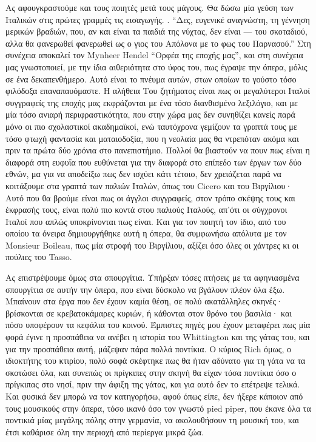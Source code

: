 Ας αφουγκραστούμε και τους ποιητές μετά τους μάγους. Θα δώσω μία γεύση των Ιταλικών στις πρώτες γραμμές τις εισαγωγής. . \enquote{Δες, ευγενικέ αναγνώστη, τη γέννηση μερικών βραδιών, που, αν και είναι τα παιδιά της νύχτας, δεν είναι --- του σκοταδιού, αλλα θα φανερωθεί φανερωθεί ως ο γιος του Απόλονα με το φως του Παρνασού.} Στη συνέχεια αποκαλεί τον Mynheer Hendel \enquote{Ορφέα της εποχής μας}, και στη συνέχεια μας γνωστοποιεί, με την ίδια αιθεριότητα στο ύφος του, πως έγραψε την όπερα, μόλις σε ένα δεκαπενθήμερο. Αυτό είναι το πνέυμα αυτών, στων οποίων το γούστο τόσο φιλόδοξα επαναπαυόμαστε. Η αλήθεια Του ζητήματος είναι πως οι μεγαλύτεροι Ιταλοί συγγραφείς της εποχής μας εκφράζονται με ένα τόσο διανθισμένο λεξιλόγιο, και με μία τόσο ανιαρή περιφραστικότητα, που στην χώρα μας δεν συνηθίζει κανείς παρά μόνο οι πιο σχολαστικοί ακαδημαϊκοί, ενώ ταυτόχρονα γεμίζουν τα γραπτά τους με τόσο φτωχή φαντασία και ματαιοδοξία, που η νεολαία μας θα ντρεπόταν ακόμα και πριν τα πρώτα δύο χρόνια στο πανεπιστήμιο. Πολλοί θα βιαστούν να πουν πως είναι η διαφορά στη ευφυΐα που ευθύνεται για την διαφορά στο επίπεδο των έργων των δύο εθνών, μα για να αποδείξω πως δεν ισχύει κάτι τέτοιο, δεν χρειάζεται παρά να κοιτάξουμε στα γραπτά των παλιών Ιταλών, όπως του Cicero και του Βιργίλιου· Αυτό που θα βρούμε είναι πως οι άγγλοι συγγραφείς, στον τρόπο σκέψης τους και έκφρασής τους, είναι πολύ πιο κοντά στου παλιούς Ιταλούς, απ'ότι οι σύγχρονοι Ιταλοί που απλώς υποκρίνονται πως είναι. Και για τον ποιητή τον ίδιο, από του οποίου τα όνειρα δημιουργήθηκε αυτή η όπερα, θα συμφωνήσω απόλυτα με τον Monsieur Boileau, πως μία στροφή του Βιργίλιου, αξίζει όσο όλες οι χάντρες κι οι πούλιες του Tasso. 

Ας επιστρέψουμε όμως στα σπουργίτια. Υπήρξαν τόσες πτήσεις με τα αφηνιασμένα σπουργίτια σε αυτήν την όπερα, που είναι δύσκολο να βγάλουν πλέον όλα έξω. Μπαίνουν στα έργα που δεν έχουν καμία θέση, σε πολύ ακατάλληλες σκηνές· βρίσκονται σε κρεβατοκάμαρες κυριών, ή κάθονται στον θρόνο του βασιλία· και πόσο υποφέρουν τα κεφάλια του κοινού. Έμπιστες πηγές μου έχουν μεταφέρει πως μία φορά έγινε η προσπάθεια να ανέβει η ιστορία του Whittington και της γάτας του, και για την προσπάθεια αυτή, μάζεψαν πάρα πολλά ποντίκια. Ο κύριος Rich όμως, ο ιδιοκτήτης του κτιρίου, πολύ σοφά σκέφτηκε πως θα ήταν αδύνατο για τη γάτα να τα σκοτώσει όλα, και συνεπώς οι πρίγκιπες στην σκηνή θα είχαν τόσα ποντίκια όσο ο πρίγκιπας στο νησί, πριν την άφιξη της γάτας, και για αυτό δεν το επέτρεψε τελικά. Και φυσικά δεν μπορώ να τον κατηγορήσω, αφού όπως είπε, δεν ήξερε κάποιον από τους μουσικούς στην όπερα, τόσο ικανό όσο τον γνωστό pied piper, που έκανε όλα τα ποντικιά μίας μεγάλης πόλης στην γερμανία, να ακολουθήσουν τη μουσική του, και έτσι καθάρισε όλη την περιοχή από περίεργα μικρά ζώα.

